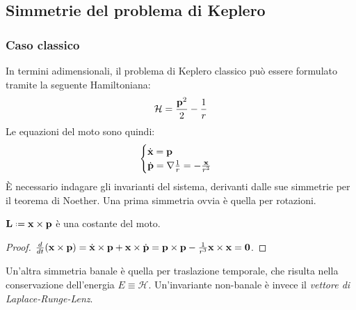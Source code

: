 \subsection{Simmetrie del problema di Keplero}

\subsubsection{Caso classico}

In termini adimensionali, il problema di Keplero classico può essere formulato tramite la seguente Hamiltoniana:
\begin{equation}
	\mathcal{H} = \frac{\mathbf{p}^2}{2} - \frac{1}{r}
	\label{eq:3.50}
\end{equation}
Le equazioni del moto sono quindi:
\begin{equation}
	\begin{cases}
		\dot{\mathbf{x}} = \mathbf{p} \\
		\dot{\mathbf{p}} = \nabla \frac{1}{r} = - \frac{\mathbf{x}}{r^3}
	\end{cases}
	\label{eq:3.51}
\end{equation}
È necessario indagare gli invarianti del sistema, derivanti dalle sue simmetrie per il teorema di Noether. Una prima simmetria ovvia è quella per rotazioni.

\begin{proposition}
	$ \ve{L} \defeq \ve{x} \times \ve{p} $ è una costante del moto.
\end{proposition}
\begin{proof}
	$ \frac{d}{dt} (\mathbf{x} \times \mathbf{p}) = \dot{\mathbf{x}} \times \mathbf{p} + \mathbf{x} \times \dot{\mathbf{p}} = \mathbf{p} \times \mathbf{p} - \frac{1}{r^3} \mathbf{x} \times \mathbf{x} = \mathbf{0} $.
\end{proof}

Un'altra simmetria banale è quella per traslazione temporale, che risulta nella conservazione dell'energia $ E \equiv \mathcal{H} $. Un'invariante non-banale è invece il \textit{vettore di Laplace-Runge-Lenz}.

